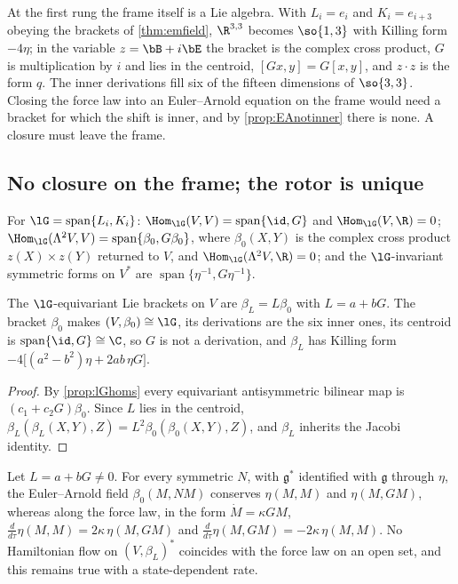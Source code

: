 At the first rung the frame itself is a Lie algebra. With $L_i=e_i$ and $K_i=e_{i+3}$ obeying the brackets of \cref{thm:emfield}, $\R^{3,3}$
becomes $\so{1,3}$ with Killing form $-4\eta$; in the variable $z=\bB+i\bE$ the bracket is the complex cross product, $G$ is multiplication by $i$
and lies in the centroid, $[Gx,y]=G[x,y]$, and $z\cdot z$ is the form $q$. The inner derivations fill six of the fifteen dimensions of
$\so{3,3}$. Closing the force law into an Euler--Arnold equation on the frame would need a bracket for which the shift is inner, and by
\cref{prop:EAnotinner} there is none. A closure must leave the frame.

\subsection{No closure on the frame; the rotor is unique}

\begin{proposition}
\label{prop:lGhoms}
For $\lG=\operatorname{span}\{L_i,K_i\}$: $\Hom_{\lG}(V,V)=\operatorname{span}\{\id,G\}$ and $\Hom_{\lG}(V,\R)=0$;
$\Hom_{\lG}(\Lambda^2V,V)=\operatorname{span}\{\beta_0,G\beta_0\}$, where $\beta_0(X,Y)$ is the complex cross product $z(X)\times z(Y)$ returned to
$V$, and $\Hom_{\lG}(\Lambda^2V,\R)=0$; and the $\lG$-invariant symmetric forms on $V^*$ are $\operatorname{span}\{\eta^{-1},G\eta^{-1}\}$.
\end{proposition}

\begin{theorem}
\label{thm:brackets}
The $\lG$-equivariant Lie brackets on $V$ are $\beta_L=L\beta_0$ with $L=a+bG$. The bracket $\beta_0$ makes $(V,\beta_0)\cong\lG$, its derivations
are the six inner ones, its centroid is $\operatorname{span}\{\id,G\}\cong\C$, so $G$ is not a derivation, and $\beta_L$ has Killing form
$-4\bigl[(a^2-b^2)\eta+2ab\,\eta G\bigr]$.
\end{theorem}

\begin{proof}
By \cref{prop:lGhoms} every equivariant antisymmetric bilinear map is $(c_1+c_2G)\beta_0$. Since $L$ lies in the centroid,
$\beta_L(\beta_L(X,Y),Z)=L^2\beta_0(\beta_0(X,Y),Z)$, and $\beta_L$ inherits the Jacobi identity.
\end{proof}

\begin{theorem}
\label{thm:noframe}
Let $L=a+bG\neq0$. For every symmetric $N$, with $\mathfrak g^*$ identified with $\mathfrak g$ through $\eta$, the Euler--Arnold field
$\beta_0(M,NM)$ conserves $\eta(M,M)$ and $\eta(M,GM)$, whereas along the force law, in the form $\dot M=\kappa GM$,
$\tfrac{d}{d\tau}\eta(M,M)=2\kappa\,\eta(M,GM)$ and $\tfrac{d}{d\tau}\eta(M,GM)=-2\kappa\,\eta(M,M)$. No Hamiltonian flow on $(V,\beta_L)^*$ coincides
with the force law on an open set, and this remains true with a state-dependent rate.
\end{theorem}

